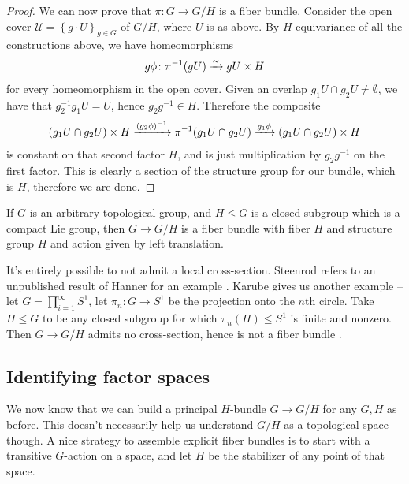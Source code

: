 \documentclass[11pt]{book}
\begin{document}
\begin{proof}
We can now prove that $\pi \colon G \to G/H$ is a fiber bundle. Consider the open cover $\mathcal{U} = \left\{ g\cdot U \right\}_{g\in G}$ of $G/H$, where $U$ is as above. By $H$-equivariance of all the constructions above, we have homeomorphisms
\begin{align*}
    g\phi \colon \pi^{-1}(gU) \xrightarrow{\sim} gU \times H
\end{align*}
for every homeomorphism in the open cover. Given an overlap $g_1U \cap g_2U \ne \emptyset$, we have that $g_2^{-1}g_1U = U$, hence $g_2 g^{-1} \in H$. Therefore the composite
\begin{align*}
    (g_1 U \cap g_2 U) \times H \xrightarrow{(g_2 \phi)^{-1}} \pi^{-1}(g_1 U \cap g_2 U) \xrightarrow{g_1 \phi} (g_1 U \cap g_2 U) \times H
\end{align*}
is constant on that second factor $H$, and is just multiplication by $g_2 g^{-1}$ on the first factor. This is clearly a section of the structure group for our bundle, which is $H$, therefore we are done.
\end{proof}

\begin{theorem} If $G$ is an arbitrary topological group, and $H \le G$ is a closed subgroup which is a compact Lie group, then $G \to G/H$ is a fiber bundle with fiber $H$ and structure group $H$ and action given by left translation.
\end{theorem}

\begin{remark} It's entirely possible to not admit a local cross-section. Steenrod refers to an unpublished result of Hanner for an example \cite[p.~33]{Steenrod-fibre-bundles}. Karube gives us another example -- let $G = \prod_{i=1}^\infty S^1$, let $\pi_n \colon G \to S^1$ be the projection onto the $n$th circle. Take $H \le G$ to be any closed subgroup for which $\pi_n(H) \le S^1$ is finite and nonzero. Then $G\to G/H$ admits no cross-section, hence is not a fiber bundle \cite{karubeLocalCrosssectionsLocally1958}.
\end{remark}



\subsection{Identifying factor spaces} We now know that we can build a principal $H$-bundle $G \to G/H$ for any $G,H$ as before. This doesn't necessarily help us understand $G/H$ as a topological space though. A nice strategy to assemble explicit fiber bundles is to start with a transitive $G$-action on a space, and let $H$ be the stabilizer of any point of that space.
\end{document}
